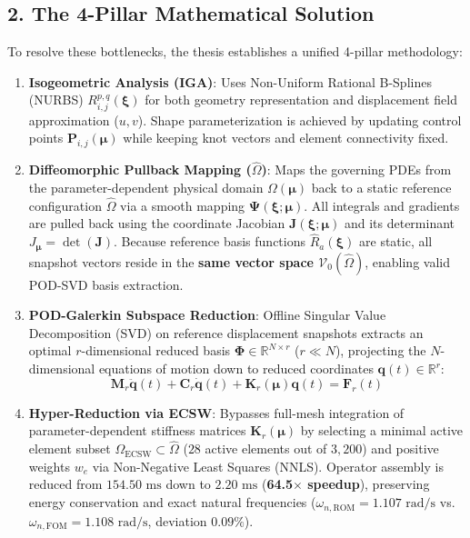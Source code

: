\documentclass[11pt,a4paper]{article}
\begin{document}
\subsection*{2. The 4-Pillar Mathematical Solution}
To resolve these bottlenecks, the thesis establishes a unified 4-pillar methodology:
\begin{enumerate}[label=\textbf{\arabic*.}]
    \item \textbf{Isogeometric Analysis (IGA)}: Uses Non-Uniform Rational B-Splines (NURBS) $R_{i,j}^{p,q}(\boldsymbol{\xi})$ for both geometry representation and displacement field approximation ($u, v$). Shape parameterization is achieved by updating control points $\mathbf{P}_{i,j}(\boldsymbol{\mu})$ while keeping knot vectors and element connectivity fixed.
    \item \textbf{Diffeomorphic Pullback Mapping ($\hat{\Omega}$)}: Maps the governing PDEs from the parameter-dependent physical domain $\Omega(\boldsymbol{\mu})$ back to a static reference configuration $\hat{\Omega}$ via a smooth mapping $\boldsymbol{\Psi}(\boldsymbol{\xi}; \boldsymbol{\mu})$. All integrals and gradients are pulled back using the coordinate Jacobian $\mathbf{J}(\boldsymbol{\xi}; \boldsymbol{\mu})$ and its determinant $J_{\boldsymbol{\mu}} = \det(\mathbf{J})$. Because reference basis functions $\hat{R}_a(\boldsymbol{\xi})$ are static, all snapshot vectors reside in the \textbf{same vector space $\mathcal{V}_0(\hat{\Omega})$}, enabling valid POD-SVD basis extraction.
    \item \textbf{POD-Galerkin Subspace Reduction}: Offline Singular Value Decomposition (SVD) on reference displacement snapshots extracts an optimal $r$-dimensional reduced basis $\boldsymbol{\Phi} \in \mathbb{R}^{N \times r}$ ($r \ll N$), projecting the $N$-dimensional equations of motion down to reduced coordinates $\mathbf{q}(t) \in \mathbb{R}^r$:
    \begin{equation}
        \mathbf{M}_r \ddot{\mathbf{q}}(t) + \mathbf{C}_r \dot{\mathbf{q}}(t) + \mathbf{K}_r(\boldsymbol{\mu}) \mathbf{q}(t) = \mathbf{F}_r(t)
    \end{equation}
    \item \textbf{Hyper-Reduction via ECSW}: Bypasses full-mesh integration of parameter-dependent stiffness matrices $\mathbf{K}_r(\boldsymbol{\mu})$ by selecting a minimal active element subset $\Omega_{\text{ECSW}} \subset \hat{\Omega}$ ($28$ active elements out of $3,200$) and positive weights $w_e$ via Non-Negative Least Squares (NNLS). Operator assembly is reduced from $154.50\text{ ms}$ down to $2.20\text{ ms}$ (\textbf{64.5$\times$ speedup}), preserving energy conservation and exact natural frequencies ($\omega_{n,\text{ROM}} = 1.107\text{ rad/s}$ vs. $\omega_{n,\text{FOM}} = 1.108\text{ rad/s}$, deviation $0.09\%$).
\end{enumerate}
\end{document}
